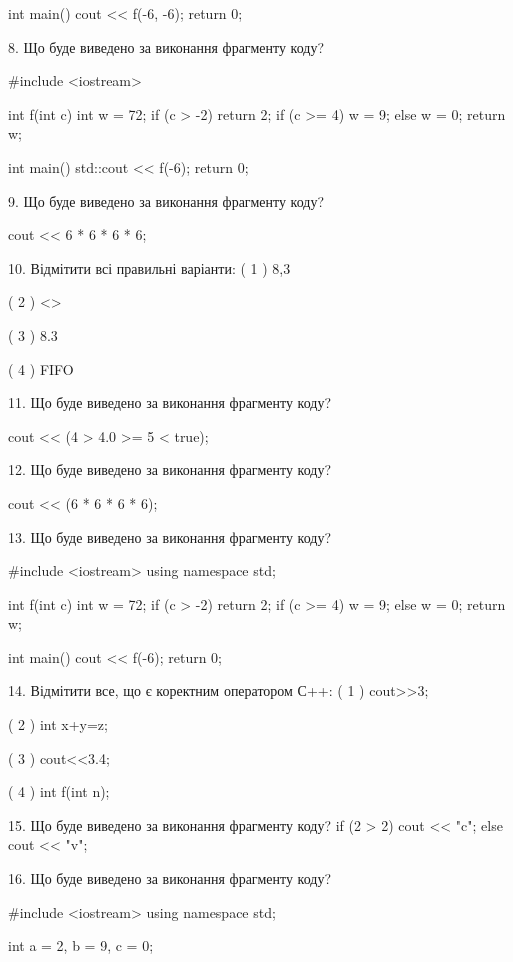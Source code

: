 \documentclass[11pt]{article}
\begin{document}
int main(){
    cout << f(-6, -6);
    return 0;
}

8. Що буде виведено за виконання фрагменту коду?

#include <iostream>

int f(int c){
    int w = 72;
    if (c > -2) 
        return 2;
    if (c >= 4)
         w = 9;
    else
         w = 0;
    return w;
}

int main(){
    std::cout << f(-6);
    return 0;
}


9. Що буде виведено за виконання фрагменту коду?

cout << 6 * 6 * 6 * 6;

10. Відмітити всі правильні варіанти:
( 1 ) 8,3

( 2 ) <>

( 3 ) 8.3

( 4 ) FIFO

11. Що буде виведено за виконання фрагменту коду?

cout << (4 > 4.0 >= 5 < true);

12. Що буде виведено за виконання фрагменту коду?

cout << (6 * 6 * 6 * 6);

13. Що буде виведено за виконання фрагменту коду?

#include <iostream>
using namespace std;

int f(int c){
    int w = 72;
    if (c > -2) 
        return 2;
    if (c >= 4)
         w = 9;
    else
         w = 0;
    return w;
}

int main(){
    cout << f(-6);
    return 0;
}


14. Відмітити все, що є коректним оператором С++:
( 1 ) cout>>3;

( 2 ) int x+y=z;

( 3 ) cout<<3.4;

( 4 ) int f(int n);

15. Що буде виведено за виконання фрагменту коду?
if (2 > 2)
    cout << "c";
else
    cout << "v";


16. Що буде виведено за виконання фрагменту коду?

#include <iostream>
using namespace std;

int a = 2, b = 9, c = 0;
\end{document}
